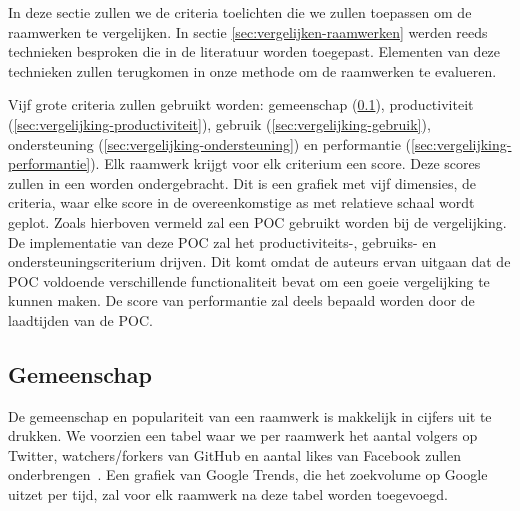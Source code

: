 
In deze sectie zullen we de criteria toelichten die we zullen toepassen om de raamwerken te vergelijken.
In sectie \ref{sec:vergelijken-raamwerken} werden reeds technieken besproken die in de literatuur worden toegepast.
Elementen van deze technieken zullen terugkomen in onze methode om de raamwerken te evalueren.

Vijf grote criteria zullen gebruikt worden:  gemeenschap (\ref{sec:vergelijking-gemeenschap}), productiviteit (\ref{sec:vergelijking-productiviteit}), gebruik (\ref{sec:vergelijking-gebruik}), ondersteuning (\ref{sec:vergelijking-ondersteuning}) en performantie (\ref{sec:vergelijking-performantie}). 
Elk raamwerk krijgt voor elk criterium een score. 
Deze scores zullen in een  worden ondergebracht.  
Dit is een grafiek met vijf dimensies,  de criteria,     waar elke score in de overeenkomstige as met relatieve schaal wordt geplot.
Zoals hierboven vermeld zal een POC gebruikt worden bij de vergelijking.
De implementatie van deze POC zal het productiviteits-, gebruiks- en ondersteuningscriterium drijven.  
Dit komt omdat de auteurs ervan uitgaan dat de POC voldoende verschillende functionaliteit bevat om een goeie vergelijking te kunnen maken.
De score van performantie zal deels bepaald worden door de laadtijden van de POC.


\subsection{Gemeenschap}
\label{sec:vergelijking-gemeenschap}
De gemeenschap en populariteit van een raamwerk is makkelijk in cijfers uit te drukken. 
We voorzien een tabel waar we per raamwerk het aantal volgers op Twitter, watchers/forkers van GitHub en aantal likes van Facebook zullen onderbrengen~\cite{Sarrafi2012a,Ayuso2012}. 
Een grafiek van Google Trends, die het zoekvolume op Google uitzet per tijd, zal voor elk raamwerk na deze tabel worden toegevoegd.
